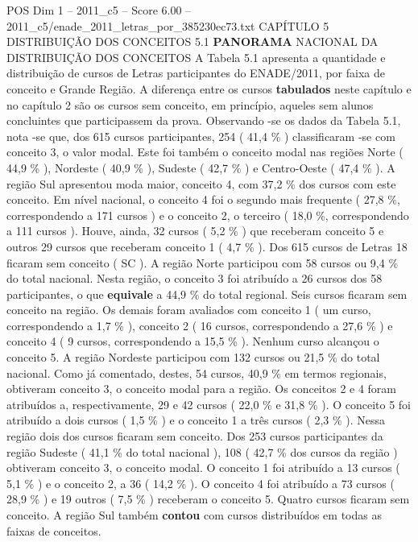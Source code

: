 \begin{textsample}{POS Dim 1 – 2011\_c5 – Score 6.00 – 2011\_c5/enade\_2011\_letras\_por\_385230ec73.txt}  \label{ex:f1_pos_122}
CAPÍTULO 5 DISTRIBUIÇÃO DOS CONCEITOS 5.1 \textbf{PANORAMA} NACIONAL DA DISTRIBUIÇÃO DOS CONCEITOS A Tabela 5.1 apresenta a quantidade e distribuição de cursos de Letras participantes do ENADE/2011, por faixa de conceito e Grande Região.
A diferença entre os cursos \textbf{tabulados} neste capítulo e no capítulo 2 são os cursos sem conceito, em princípio, aqueles sem alunos concluintes que participassem da prova.
Observando -se os dados da Tabela 5.1, nota -se que, dos 615 cursos participantes, 254 ( 41,4 \% ) classificaram -se com conceito 3, o valor modal.
Este foi também o conceito modal nas regiões Norte ( 44,9 \% ), Nordeste ( 40,9 \% ), Sudeste ( 42,7 \% ) e Centro-Oeste ( 47,4 \% ).
A região Sul apresentou moda maior, conceito 4, com 37,2 \% dos cursos com este conceito.
Em nível nacional, o conceito 4 foi o segundo mais frequente ( 27,8 \%, correspondendo a 171 cursos ) e o conceito 2, o terceiro ( 18,0 \%, correspondendo a 111 cursos ).
Houve, ainda, 32 cursos ( 5,2 \% ) que receberam conceito 5 e outros 29 cursos que receberam conceito 1 ( 4,7 \% ).
Dos 615 cursos de Letras 18 ficaram sem conceito ( SC ).
A região Norte participou com 58 cursos ou 9,4 \% do total nacional.
Nesta região, o conceito 3 foi atribuído a 26 cursos dos 58 participantes, o que \textbf{equivale} a 44,9 \% do total regional.
Seis cursos ficaram sem conceito na região.
Os demais foram avaliados com conceito 1 ( um curso, correspondendo a 1,7 \% ), conceito 2 ( 16 cursos, correspondendo a 27,6 \% ) e conceito 4 ( 9 cursos, correspondendo a 15,5 \% ).
Nenhum curso alcançou o conceito 5.
A região Nordeste participou com 132 cursos ou 21,5 \% do total nacional.
Como já comentado, destes, 54 cursos, 40,9 \% em termos regionais, obtiveram conceito 3, o conceito modal para a região.
Os conceitos 2 e 4 foram atribuídos a, respectivamente, 29 e 42 cursos ( 22,0 \% e 31,8 \% ).
O conceito 5 foi atribuído a dois cursos ( 1,5 \% ) e o conceito 1 a três cursos ( 2,3 \% ).
Nessa região dois dos cursos ficaram sem conceito.
Dos 253 cursos participantes da região Sudeste ( 41,1 \% do total nacional ), 108 ( 42,7 \% dos cursos da região ) obtiveram conceito 3, o conceito modal.
O conceito 1 foi atribuído a 13 cursos ( 5,1 \% ) e o conceito 2, a 36 ( 14,2 \% ).
O conceito 4 foi atribuído a 73 cursos ( 28,9 \% ) e 19 outros ( 7,5 \% ) receberam o conceito 5.
Quatro cursos ficaram sem conceito.
A região Sul também \textbf{contou} com cursos distribuídos em todas as faixas de conceitos.

\end{textsample}
